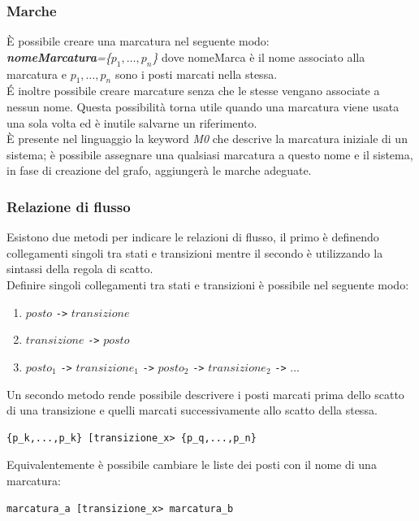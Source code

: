 \documentclass[italian,12pt]{book}
\begin{document}
\subsubsection{Marche}
\`E possibile creare una marcatura nel seguente modo:\\
\emph{{\bf nomeMarcatura}=\{$p_1,\dots,p_n$\}} dove nomeMarca
  è il nome associato alla marcatura e $p_1,\dots,p_n$
  sono i posti marcati nella stessa.\\
\'E inoltre possibile creare marcature senza che le
stesse vengano associate a nessun nome. Questa
possibilità torna utile quando una marcatura viene usata
una sola volta ed è inutile salvarne un riferimento.\\
\`E presente nel linguaggio la keyword \emph{M0} che descrive la
marcatura iniziale di un sistema; è possibile assegnare
una qualsiasi marcatura a questo nome e il sistema, in
fase di creazione del grafo, aggiungerà le marche
adeguate.
% 
\subsubsection{Relazione di flusso}
Esistono due metodi per indicare le relazioni di flusso, il
primo è definendo collegamenti singoli tra stati e
transizioni mentre il secondo è utilizzando la sintassi
della regola di scatto.\\
Definire singoli collegamenti tra stati e transizioni è
possibile nel seguente modo:
\begin{enumerate}
\item $posto$ \verb"->"  $transizione$
\item $transizione$ \verb"->" $posto$
\item $posto_1$ \verb"->" $transizione_1$ \verb"->" $posto_2$ \verb"->" $
  transizione_2$ \verb"->" $\dots$
\end{enumerate}
Un secondo metodo rende possibile descrivere i posti
marcati prima dello scatto di una transizione e quelli
marcati successivamente allo scatto della stessa.
\begin{verbatim}{p_k,...,p_k} [transizione_x> {p_q,...,p_n}
\end{verbatim}
Equivalentemente è possibile cambiare le liste dei
posti con il nome di una marcatura:
\begin{verbatim}marcatura_a [transizione_x> marcatura_b
\end{verbatim}
%
\end{document}
